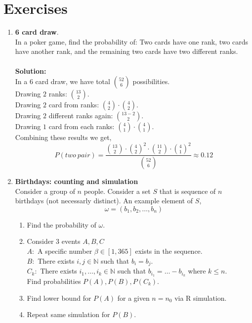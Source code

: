 \section{Exercises}

\begin{enumerate}
    \item \textbf{6 card draw}.\\
        In a poker game, find the probability of: Two cards have one rank, two cards have another rank, and the remaining two cards have two different ranks. \\
    \\
    \textbf{Solution:} \\
    In a 6 card draw, we have total $\binom{52}{6}$ possibilities. \\
    Drawing $2$ ranks: $\binom{13}{2}$.\\
    Drawing $2$ card from ranks: $\binom{4}{2} \cdot \binom{4}{2}$.\\
    Drawing $2$ different ranks again: $\binom{13-2}{2}$. \\
    Drawing $1$ card from each ranks: $\binom{4}{1} \cdot \binom{4}{1}$.\\
    Combining these results we get,
    \[ P(two \  pair) = \frac{\binom{13}{2}\cdot \binom{4}{2}^2\cdot \binom{11}{2} \cdot \binom{4}{1}^2}{\binom{52}{6}} \approx  0.12\]
\item \textbf{Birthdays: counting and simulation} \\
    Consider a group of $n$ people. Consider a set $S$ that is sequence of  $n$ birthdays (not necessarly distinct). An example element of $S$,
    \[ \omega = (b_1,b_2,\ldots,b_n)\]
    \begin{enumerate}
        \item Find the probability of $\omega$.
        \item Consider $3$ events $A,B,C$ \\
            $A:$ A specific number $\beta\in [1,365 ]$ exists in the sequence. \\
            $B:$ There exists $i,j \in \mathbb{N}$ such that $b_i = b_j$. \\
            $C_k:$ There exists $i_1,\ldots, i_k \in \mathbb{N}$ such that $b_{i_1}= \ldots - b_{i_k}$ where $k \le n$. \\
            Find probabilities $P(A),P(B),P(C_k)$.
        \item Find lower bound for $P(A)$ for a given $n = n_0$ via R simulation.
        \item Repeat same simulation for $P(B)$.

\end{enumerate}
\end{enumerate}
